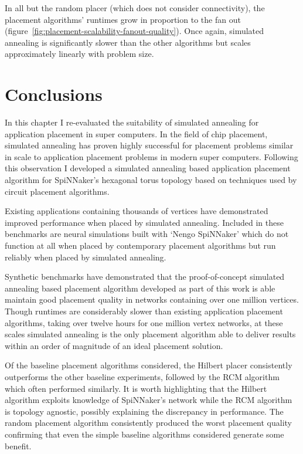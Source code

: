 				In all but the random placer (which does not consider connectivity),
				the placement algorithms' runtimes grow in proportion to the fan out
				(figure~\ref{fig:placement-scalability-fanout-quality}). Once again,
				simulated annealing is significantly slower than the other algorithms
				but scales approximately linearly with problem size.
	
	\section{Conclusions}
		
		In this chapter I re-evaluated the suitability of simulated annealing for
		application placement in super computers. In the field of chip placement,
		simulated annealing has proven highly successful for placement problems
		similar in scale to application placement problems in modern super
		computers. Following this observation I developed a simulated annealing
		based application placement algorithm for SpiNNaker's hexagonal torus
		topology based on techniques used by circuit placement algorithms.
		
		Existing applications containing thousands of vertices have demonstrated
		improved performance when placed by simulated annealing. Included in these
		benchmarks are neural simulations built with `Nengo SpiNNaker' which do not
		function at all when placed by contemporary placement algorithms but run
		reliably when placed by simulated annealing.
		
		Synthetic benchmarks have demonstrated that the proof-of-concept simulated
		annealing based placement algorithm developed as part of this work is able
		maintain good placement quality in networks containing over one million
		vertices. Though runtimes are considerably slower than existing application
		placement algorithms, taking over twelve hours for one million vertex
		networks, at these scales simulated annealing is the only placement
		algorithm able to deliver results within an order of magnitude of an ideal
		placement solution.
		
		Of the baseline placement algorithms considered, the Hilbert placer
		consistently outperforms the other baseline experiments, followed by the
		RCM algorithm which often performed similarly. It is worth highlighting
		that the Hilbert algorithm exploits knowledge of SpiNNaker's network while
		the RCM algorithm is topology agnostic, possibly explaining the discrepancy
		in performance. The random placement algorithm consistently produced the
		worst placement quality confirming that even the simple baseline algorithms
		considered generate some benefit.
		
